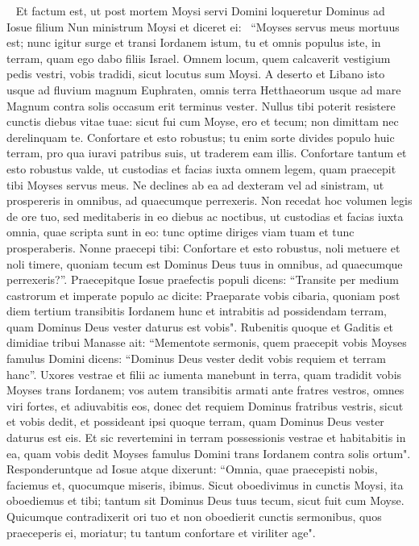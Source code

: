 
\begin{biblechapter}   
\verse Et factum est, ut post mortem Moysi servi Domini loqueretur Dominus ad Iosue filium Nun ministrum Moysi et diceret ei:  
\verse “Moyses servus meus mortuus est; nunc igitur surge et transi Iordanem istum, tu et omnis populus iste, in terram, quam ego dabo filiis Israel. 
\verse Omnem locum, quem calcaverit vestigium pedis vestri, vobis tradidi, sicut locutus sum Moysi. 
\verse A deserto et Libano isto usque ad fluvium magnum Euphraten, omnis terra Hetthaeorum usque ad mare Magnum contra solis occasum erit terminus vester. 
\verse Nullus tibi poterit resistere cunctis diebus vitae tuae: sicut fui cum Moyse, ero et tecum; non dimittam nec derelinquam te. 
\verse Confortare et esto robustus; tu enim sorte divides populo huic terram, pro qua iuravi patribus suis, ut traderem eam illis. 
\verse Confortare tantum et esto robustus valde, ut custodias et facias iuxta omnem legem, quam praecepit tibi Moyses servus meus. Ne declines ab ea ad dexteram vel ad sinistram, ut prospereris in omnibus, ad quaecumque perrexeris. 
\verse Non recedat hoc volumen legis de ore tuo, sed meditaberis in eo diebus ac noctibus, ut custodias et facias iuxta omnia, quae scripta sunt in eo: tunc optime diriges viam tuam et tunc prosperaberis. 
\verse Nonne praecepi tibi: Confortare et esto robustus, noli metuere et noli timere, quoniam tecum est Dominus Deus tuus in omnibus, ad quaecumque perrexeris?”. 
\verse Praecepitque Iosue praefectis populi dicens: “Transite per medium castrorum et imperate populo ac dicite: 
\verse Praeparate vobis cibaria, quoniam post diem tertium transibitis Iordanem hunc et intrabitis ad possidendam terram, quam Dominus Deus vester daturus est vobis". 
\verse Rubenitis quoque et Gaditis et dimidiae tribui Manasse ait: 
\verse “Mementote sermonis, quem praecepit vobis Moyses famulus Domini dicens: “Dominus Deus vester dedit vobis requiem et terram hanc”. 
\verse Uxores vestrae et filii ac iumenta manebunt in terra, quam tradidit vobis Moyses trans Iordanem; vos autem transibitis armati ante fratres vestros, omnes viri fortes, et adiuvabitis eos, 
\verse donec det requiem Dominus fratribus vestris, sicut et vobis dedit, et possideant ipsi quoque terram, quam Dominus Deus vester daturus est eis. Et sic revertemini in terram possessionis vestrae et habitabitis in ea, quam vobis dedit Moyses famulus Domini trans Iordanem contra solis ortum". 
\verse Responderuntque ad Iosue atque dixerunt: “Omnia, quae praecepisti nobis, faciemus et, quocumque miseris, ibimus. 
\verse Sicut oboedivimus in cunctis Moysi, ita oboediemus et tibi; tantum sit Dominus Deus tuus tecum, sicut fuit cum Moyse. 
\verse Quicumque contradixerit ori tuo et non oboedierit cunctis sermonibus, quos praeceperis ei, moriatur; tu tantum confortare et viriliter age". 
\end{biblechapter}


